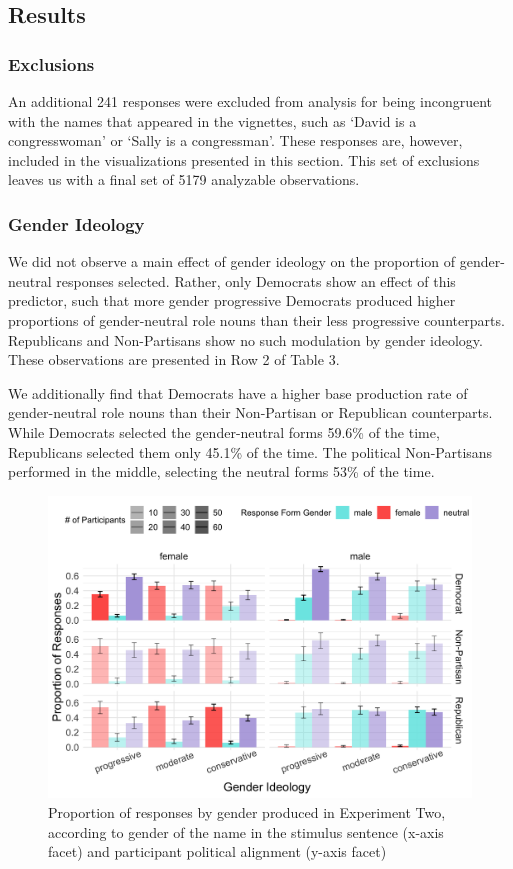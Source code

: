 \documentclass[10pt,letterpaper]{article}
\begin{document}
	
	\subsection{Results}
	
	\subsubsection{Exclusions} 
	An additional 241 responses were excluded from analysis for being incongruent with the names that appeared in the vignettes, such as `David is a congresswoman' or `Sally is a congressman'. These responses are, however, included in the visualizations presented in this section. This set of exclusions leaves us with a final set of 5179 analyzable observations.
	
	\subsubsection{Gender Ideology} We did not observe a main effect of gender ideology on the proportion of gender-neutral responses selected. Rather, only Democrats show an effect of this predictor, such that more gender progressive Democrats produced higher proportions of gender-neutral role nouns than their less progressive counterparts. Republicans and Non-Partisans show no such modulation by gender ideology. These observations are presented in Row 2 of Table 3. \par 
	We additionally find that Democrats have a higher base production rate of gender-neutral role nouns than their Non-Partisan or Republican counterparts. While Democrats selected the gender-neutral forms 59.6\% of the time, Republicans selected them only 45.1\% of the time. The political Non-Partisans performed in the middle, selecting the neutral forms 53\% of the time.
	
	\begin{figure}[h]
		\centering
		\includegraphics[scale=0.12]{prod-3x2x3.png}
		\caption{Proportion of responses by gender produced in Experiment Two, according to gender of the name in the stimulus sentence (x-axis facet) and participant political alignment (y-axis facet)}
	\end{figure}
		
\end{document}
